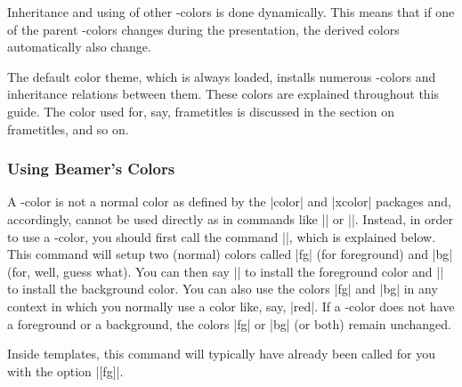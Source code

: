 Inheritance and using of other \beamer-colors is done dynamically. This means that if one of the parent \beamer-colors changes during the presentation, the derived colors automatically also change.

The default color theme, which is always loaded, installs numerous \beamer-colors and inheritance relations between them. These colors are explained throughout this guide. The color used for, say, frametitles is discussed in the section on frametitles, and so on.

\subsubsection{Using Beamer's Colors}

A \beamer-color is not a normal color as defined by the |color| and |xcolor| packages and, accordingly, cannot be used directly as in commands like |\color| or ||. Instead, in order to use a \beamer-color, you should first call the command |\usebeamercolor|, which is explained below. This command will setup two (normal) colors called |fg| (for foreground) and |bg| (for, well, guess what). You can then say |\color{fg}| to install the foreground color and |\color{bg}| to install the background color. You can also use the colors |fg| and |bg| in any context in which you normally use a color like, say, |red|. If a \beamer-color does not have a foreground or a background, the colors |fg| or |bg| (or both) remain unchanged.

Inside templates, this command will typically have already been called for you with the option |[fg]|.

